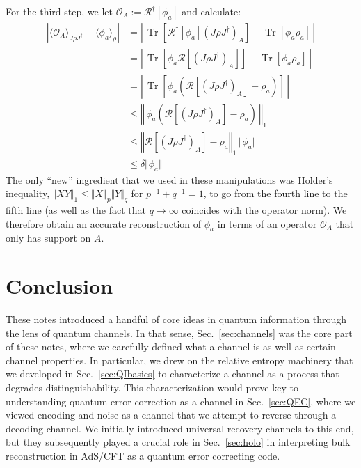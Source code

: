 \documentclass[a4paper,11pt]{article}
\newcommand{\Sec}[1]{Sec.~\ref{#1}}
\DeclareMathOperator{\Tr}{Tr}
\newcommand{\Oh}{{\mathcal{O}}}
\begin{document}
For the third step, we let $\Oh_A := \mathcal{R}^\dagger[\phi_a]$ and calculate:
\begin{align*}
\left| \langle \Oh_A \rangle_{J\rho J^\dagger} - \langle \phi_a \rangle_\rho  \right| &= \left| \, \Tr\left[ \mathcal{R}^\dagger[\phi_a] (J \rho J^\dagger)_A \right] - \Tr [\phi_a \rho_a] \, \right| \\
& = \left| \, \Tr\left[ \phi_a \mathcal{R}[(J \rho J^\dagger)_A] \right] - \Tr [\phi_a \rho_a]  \, \right| \\
&=  \left| \, \Tr\left[ \phi_a \left(\mathcal{R}[(J \rho J^\dagger)_A] -  \rho_a \right) \right] \, \right| \\
&\leq \left\Vert \, \phi_a \left(\mathcal{R}[(J \rho J^\dagger)_A] -  \rho_a \right) \, \right\Vert_1 \\
&\leq \left\Vert\mathcal{R}[(J \rho J^\dagger)_A] -  \rho_a \right\Vert_1 \, \Vert \phi_a \Vert \\
&\leq \delta \Vert \phi_a \Vert
\end{align*}
The only ``new'' ingredient that we used in these manipulations was Holder's inequality, $\Vert XY \Vert_1 \leq \Vert X \Vert_p \Vert Y \Vert_q$ for $p^{-1} + q^{-1} = 1$, to go from the fourth line to the fifth line (as well as the fact that $q \rightarrow \infty$ coincides with the operator norm).
We therefore obtain an accurate reconstruction of $\phi_a$ in terms of an operator $\Oh_A$ that only has support on $A$.

\section{Conclusion}
\label{sec:conc}

These notes introduced a handful of core ideas in quantum information through the lens of quantum channels.
In that sense, \Sec{sec:channels} was the core part of these notes, where we carefully defined what a channel is as well as certain channel properties.
In particular, we drew on the relative entropy machinery that we developed in \Sec{sec:QIbasics} to characterize a channel as a process that degrades distinguishability.
This characterization would prove key to understanding quantum error correction as a channel in \Sec{sec:QEC}, where we viewed encoding and noise as a channel that we attempt to reverse through a decoding channel.
We initially introduced universal recovery channels to this end, but they subsequently played a crucial role in \Sec{sec:holo} in interpreting bulk reconstruction in AdS/CFT as a quantum error correcting code.
\end{document}
